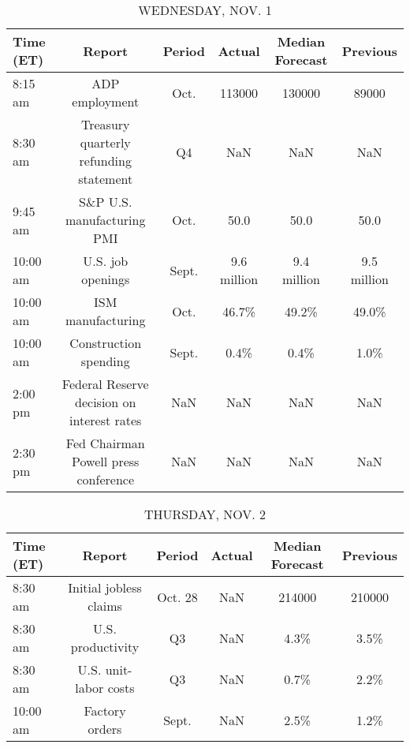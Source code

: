 \documentclass{article}%
\begin{document}
\begin{table}[htbp]%
\caption{WEDNESDAY, NOV. 1}%
\centering%
\begin{adjustbox}{width=1\textwidth}%
\begin{tabular}{lccccc}
\toprule
Time (ET) &                                     Report & Period &      Actual & Median Forecast &    Previous \\
\midrule
  8:15 am &                             ADP employment &   Oct. &      113000 &          130000 &       89000 \\
  8:30 am &     Treasury quarterly refunding statement &     Q4 &         NaN &             NaN &         NaN \\
  9:45 am &                 S\&P U.S. manufacturing PMI &   Oct. &        50.0 &            50.0 &        50.0 \\
 10:00 am &                          U.S. job openings &  Sept. & 9.6 million &     9.4 million & 9.5 million \\
 10:00 am &                          ISM manufacturing &   Oct. &       46.7\% &           49.2\% &       49.0\% \\
 10:00 am &                      Construction spending &  Sept. &        0.4\% &            0.4\% &        1.0\% \\
  2:00 pm & Federal Reserve decision on interest rates &    NaN &         NaN &             NaN &         NaN \\
  2:30 pm &       Fed Chairman Powell press conference &    NaN &         NaN &             NaN &         NaN \\
\bottomrule
\end{tabular}
%
\end{adjustbox}%
\end{table}

%


\begin{table}[htbp]%
\caption{THURSDAY, NOV. 2}%
\centering%
\begin{adjustbox}{width=1\textwidth}%
\begin{tabular}{lccccc}
\toprule
Time (ET) &                 Report &  Period & Actual & Median Forecast & Previous \\
\midrule
  8:30 am & Initial jobless claims & Oct. 28 &    NaN &          214000 &   210000 \\
  8:30 am &      U.S. productivity &      Q3 &    NaN &            4.3\% &     3.5\% \\
  8:30 am &  U.S. unit-labor costs &      Q3 &    NaN &            0.7\% &     2.2\% \\
 10:00 am &         Factory orders &   Sept. &    NaN &            2.5\% &     1.2\% \\
\bottomrule
\end{tabular}
%
\end{adjustbox}%
\end{table}
\end{document}
